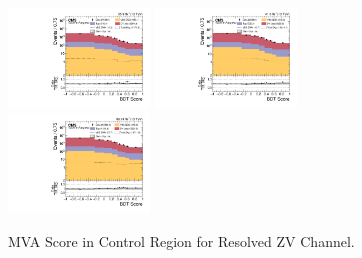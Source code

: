 \begin{figure}[!ht]
  \centering
  \includegraphics[width=0.335\textwidth]{analysis_plots/2016_zjj/cr_vjets_l/mva_score_zjj_var2_log.pdf} \hspace{-10pt}
  \includegraphics[width=0.335\textwidth]{analysis_plots/2017_zjj/cr_vjets_l/mva_score_zjj_var2_log.pdf} \hspace{-10pt}
  \includegraphics[width=0.335\textwidth]{analysis_plots/2018_zjj/cr_vjets_l/mva_score_zjj_var2_log.pdf} \hspace{-10pt} \\
  \caption[MVA Score in Control Region for Resolved ZV Channel]%
  {MVA Score in Control Region for Resolved ZV Channel.}%
  \label{fig:zjj-cr-l-mva-score}
\end{figure}

